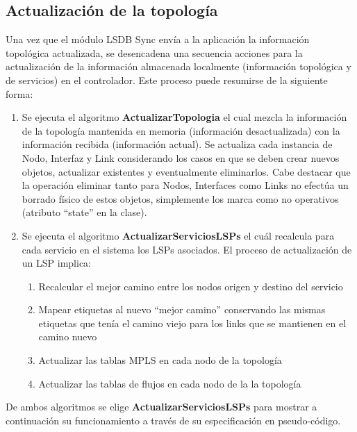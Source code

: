 \subsection{Actualizaci\'on de la topolog\'ia}
Una vez que el m\'odulo LSDB Sync envía a la aplicaci\'on la informaci\'on topol\'ogica actualizada, se desencadena una secuencia acciones para la actualizaci\'on de la informaci\'on almacenada localmente 
 (informaci\'on topol\'ogica y de servicios) en el controlador. Este proceso puede resumirse de la siguiente forma:

\begin{enumerate}
\item Se ejecuta el algoritmo \textbf{ActualizarTopologia} el cual mezcla la informaci\'on de la topolog\'ia mantenida en memoria (informaci\'on desactualizada) con la informaci\'on recibida  
 (informaci\'on actual). Se actualiza cada instancia de Nodo, Interfaz y Link considerando los casos en que se deben crear nuevos objetos, actualizar existentes y eventualmente eliminarlos. Cabe destacar que la operaci\'on eliminar tanto para Nodos, Interfaces como Links no efectúa un borrado f\'isico de estos objetos, simplemente los marca como no operativos (atributo “state” en la clase).  

\item Se ejecuta el algoritmo \textbf{ActualizarServiciosLSPs} el cu\'al recalcula para cada servicio en el sistema los LSPs asociados. El proceso de actualización de un LSP implica:

\begin{enumerate}
\item Recalcular el mejor camino entre los nodos origen y destino del servicio
\item Mapear etiquetas al nuevo “mejor camino” conservando las mismas etiquetas que ten\'ia el camino viejo para los links que se mantienen en el camino nuevo
\item Actualizar las tablas MPLS en cada nodo de la topolog\'ia
\item Actualizar las tablas de flujos en cada nodo de la la topolog\'ia  
\end{enumerate}

\end{enumerate}    

De ambos algoritmos se elige \textbf{ActualizarServiciosLSPs} para mostrar a continuaci\'on su funcionamiento a trav\'es de su especificaci\'on en pseudo-c\'odigo.
 
